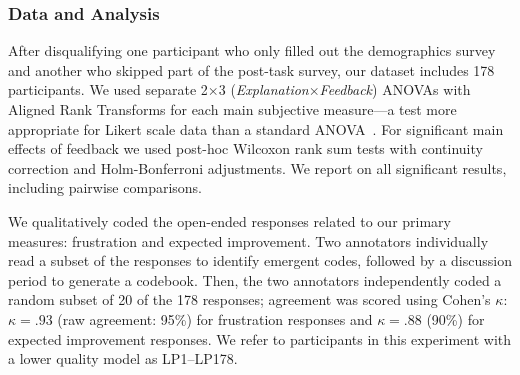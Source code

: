 \subsubsection{Data and Analysis}
After disqualifying one participant who only filled out the demographics survey and another who skipped part of the post-task survey, our dataset includes 178 participants. We used separate 2$\times$3 (\textit{Explanation}$\times$\textit{Feedback}) ANOVAs with Aligned Rank Transforms for each main subjective measure---a test more appropriate for Likert scale data than a standard ANOVA~\cite{Wobbrock2011TheProcedures}. For significant main effects of feedback we used post-hoc Wilcoxon rank sum tests with continuity correction and Holm-Bonferroni adjustments. We report on all significant results, including pairwise comparisons.

We qualitatively coded the open-ended responses related to our primary measures: frustration and expected improvement.
%
Two annotators individually read a subset of the responses to identify emergent codes, followed by a discussion period to generate a codebook.
%
Then, the two annotators independently coded a random subset of 20 of the 178 responses; agreement was scored using Cohen's $\kappa$: $\kappa=.93$ (raw agreement: 95\%) for frustration responses and $\kappa=.88$ (90\%) for expected improvement responses.
%
We refer to participants in this experiment with a lower quality model as LP1--LP178.


